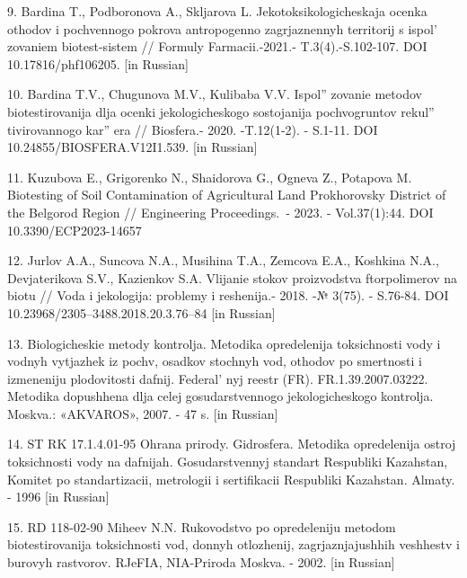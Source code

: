 \begin{refs}
9. Bardina T., Podboronova A., Skljarova L. Jekotoksikologicheskaja
ocenka othodov i pochvennogo pokrova antropogenno zagrjaznennyh
territorij s ispol' zovaniem biotest-sistem // Formuly
Farmacii.-2021.- T.3(4).-S.102-107. DOI 10.17816/phf106205. {[}in
Russian{]}

10. Bardina T.V., Chugunova M.V., Kulibaba V.V.
Ispol'' zovanie metodov biotestirovanija
dlja ocenki jekologicheskogo sostojanija pochvogruntov
rekul'' tivirovannogo
kar'' era // Biosfera.- 2020. -T.12(1-2).
- S.1-11. DOI 10.24855/BIOSFERA.V12I1.539. {[}in Russian{]}

11. Kuzubova E., Grigorenko N., Shaidorova G., Ogneva Z., Potapova M.
Biotesting of Soil Contamina\-tion of Agricultural Land Prokhorovsky
District of the Belgorod Region // Engineering Proceedings.~- 2023. -
Vol.37(1):44. DOI 10.3390/ECP2023-14657

12. Jurlov A.A., Suncova N.A., Musihina T.A., Zemcova E.A., Koshkina
N.A., Devjaterikova S.V., Kazi\-enkov S.A. Vlijanie stokov proizvodstva
ftorpolimerov na biotu // Voda i jekologija: problemy i reshenija.-
2018. -№ 3(75). - S.76-84. DOI 10.23968/2305--3488.2018.20.3.76--84
{[}in Russian{]}

13. Biologicheskie metody kontrolja. Metodika opredelenija toksichnosti
vody i vodnyh vytjazhek iz pochv, osadkov stochnyh vod, othodov po
smertnosti i izmeneniju plodovitosti dafnij. Federal' nyj
reestr (FR). FR.1.39.2007.03222. Metodika dopushhena dlja celej
gosudarstvennogo jekologicheskogo kontrolja. Moskva.: «AKVAROS», 2007. -
47 s. {[}in Russian{]}

14. ST RK 17.1.4.01-95 Ohrana prirody. Gidrosfera. Metodika opredelenija
ostroj toksichnosti vody na dafnijah. Gosudarstvennyj standart
Respubliki Kazahstan, Komitet po standartizacii, metrologii i
sertifika\-cii Respubliki Kazahstan. Almaty. - 1996 {[}in Russian{]}

15. RD 118-02-90 Miheev N.N. Rukovodstvo po opredeleniju metodom
biotestirovanija toksichnosti vod, donnyh otlozhenij, zagrjaznjajushhih
veshhestv i burovyh rastvorov. RJeFIA, NIA-Priroda Moskva. - 2002. {[}in
Russian{]}
\end{refs}

